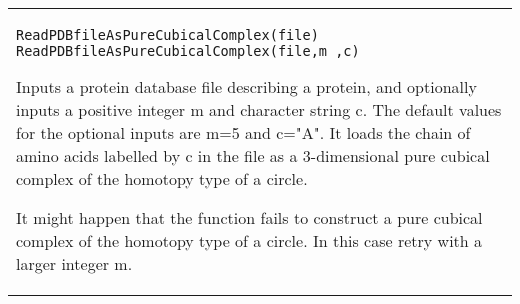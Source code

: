 \documentclass[a4paper,11pt]{report}
\begin{document}
{\begin{center}
\begin{tabular}{|l|}
 \\
 \index{ReadPDBfileAsPureCubicalComplex} \texttt{ReadPDBfileAsPureCubicalComplex(file)} \texttt{ReadPDBfileAsPureCubicalComplex(file,m ,c)} 

 Inputs a protein database file describing a protein, and optionally inputs a
positive integer m and character string c. The default values for the optional
inputs are m=5 and c="A". It loads the chain of amino acids labelled by c in
the file as a 3-dimensional pure cubical complex of the homotopy type of a
circle. 

 It might happen that the function fails to construct a pure cubical complex of
the homotopy type of a circle. In this case retry with a larger integer m. \\
\end{tabular}\\[2mm]
\end{center}

 }

 
\end{document}
